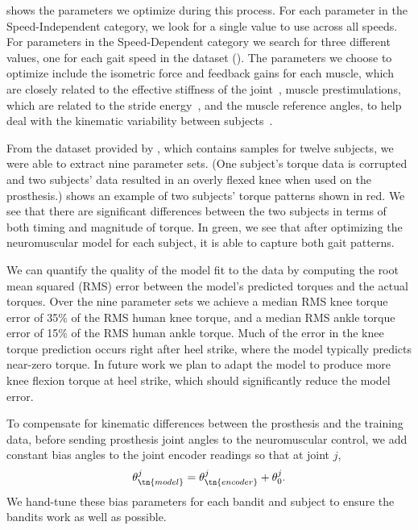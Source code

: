  shows the parameters we optimize during this process.  For
each parameter in the Speed-Independent category, we look for a single value to
use across all speeds. For parameters in the Speed-Dependent category we search
for three different values, one for each gait speed in the dataset
(). The parameters we choose to optimize
include the isometric force and feedback gains for each muscle, which are
closely related to the effective stiffness of the
joint~\citep{geyer2003positive}, muscle prestimulations, which are related to
the stride energy~\citep{geyer2003positive}, and the muscle reference angles, to
help deal with the kinematic variability between
subjects~\citep{geyer2010muscle}.

From the dataset provided by \citet{moore2015elaborate}, which contains samples
for twelve subjects, we were able to extract nine parameter sets. (One subject's
torque data is corrupted and two subjects' data resulted in an overly flexed
knee when used on the prosthesis.)  shows an example of two
subjects' torque patterns shown in red. We see that there are significant
differences between the two subjects in terms of both timing and magnitude of
torque. In green, we see that after optimizing the neuromuscular model for each
subject, it is able to capture both gait patterns. 

We can quantify the quality of the model fit to the data by computing the root
mean squared (RMS) error between the model's predicted torques and the actual
torques. Over the nine parameter sets we achieve a median RMS knee torque error
of 35\% of the RMS human knee torque, and a median RMS ankle torque error of
15\% of the RMS human ankle torque. Much of the error in the knee torque
prediction occurs right after heel strike, where the model typically predicts
near-zero torque. In future work we plan to adapt the model to produce more knee
flexion torque at heel strike, which should significantly reduce the model
error.

To compensate for kinematic differences between the prosthesis and the training
data, before sending prosthesis joint angles to the neuromuscular control, we
add constant bias angles to the joint encoder readings so that at joint $j$,
\begin{align}
    \theta_\tn{model}^j = \theta_\tn{encoder}^j + \theta_0^j.
    \label{eq:bias_param}
\end{align}
We hand-tune these bias parameters for each bandit and subject to ensure the
bandits work as well as possible.
 
